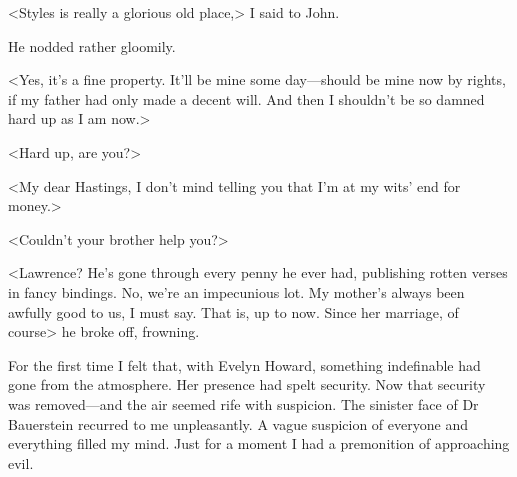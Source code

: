  <Styles is really a glorious old place,> I said to John. 

 He nodded rather gloomily. 

 <Yes, it's a fine property. It'll be mine some day—should be mine now by rights, if my father had only made a decent will. And then I shouldn't be so damned hard up as I am now.> 

 <Hard up, are you?> 

 <My dear Hastings, I don't mind telling you that I'm at my wits' end for money.> 

 <Couldn't your brother help you?> 

 <Lawrence? He's gone through every penny he ever had, publishing rotten verses in fancy bindings. No, we're an impecunious lot. My mother's always been awfully good to us, I must say. That is, up to now. Since her marriage, of course\longdash> he broke off, frowning. 

 For the first time I felt that, with Evelyn Howard, something indefinable had gone from the atmosphere. Her presence had spelt security. Now that security was removed—and the air seemed rife with suspicion. The sinister face of Dr Bauerstein recurred to me unpleasantly. A vague suspicion of everyone and everything filled my mind. Just for a moment I had a premonition of approaching evil.
